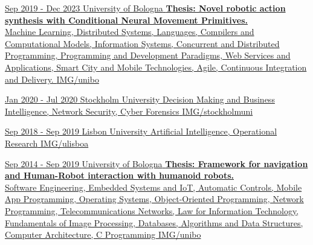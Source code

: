 \documentclass[paper=a4,fontsize=11pt, hidelinks]{temp} %
\begin{document}
\href{https://corsi.unibo.it/2cycle/ComputerScienceEngineering}{
{Sep 2019 - Dec 2023}
{University of Bologna}
{
    \textbf{Thesis: Novel robotic action synthesis with Conditional Neural Movement Primitives.}\\
     {%
    Machine Learning, Distributed Systems, Languages, Compilers and Computational Models, Information Systems, Concurrent and Distributed Programming, Programming and Development Paradigms, Web Services and Applications, Smart City and Mobile Technologies, Agile, Continuous Integration and Delivery. 
    }
} 
{IMG/unibo}
}
\sepspace

\href{https://dsv.su.se/en/}{
{Jan 2020 - Jul 2020}
{Stockholm University}
{Decision Making and Business Intelligence, Network Security, Cyber Forensics}
{IMG/stockholmuni}
}
\sepspace

\href{https://ciencias.ulisboa.pt/en}{
{Sep 2018 - Sep 2019}
{Lisbon University}
{Artificial Intelligence, Operational Research} 
{IMG/ulisboa}
}
\sepspace

\href{https://corsi.unibo.it/1cycle/ComputerScienceEngineering}{
{Sep 2014 - Sep 2019}
{University of Bologna}
{
    \textbf{Thesis: Framework for navigation and Human-Robot interaction with humanoid robots.}\\
     {%
    Software Engineering, Embedded Systems and IoT, Automatic Controls, Mobile App Programming, Operating Systems, Object-Oriented Programming, Network Programming, Telecommunications Networks, Law for Information Technology, Fundamentals of Image Processing, Databases, Algorithms and Data Structures, Computer Architecture, C Programming
    }
} 
{IMG/unibo}
}
\end{document}

